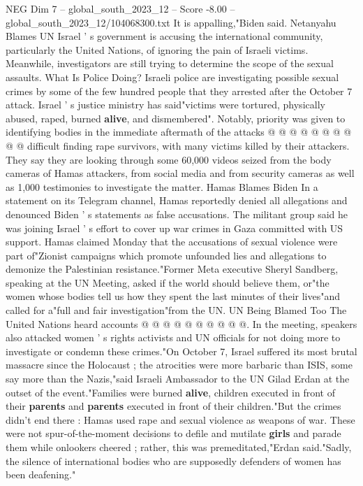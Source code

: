 \begin{textsample}{NEG Dim 7 – global\_south\_2023\_12 – Score -8.00 – global\_south\_2023\_12/104068300.txt}
It is appalling,"Biden said.
Netanyahu Blames UN Israel ' s government is accusing the international community, particularly the United Nations, of ignoring the pain of Israeli victims.
Meanwhile, investigators are still trying to determine the scope of the sexual assaults.
What Is Police Doing?
Israeli police are investigating possible sexual crimes by some of the few hundred people that they arrested after the October 7 attack.
Israel ' s justice ministry has said"victims were tortured, physically abused, raped, burned \textbf{alive}, and dismembered".
Notably, priority was given to identifying bodies in the immediate aftermath of the attacks @ @ @ @ @ @ @ @ @ @ difficult finding rape survivors, with many victims killed by their attackers.
They say they are looking through some 60,000 videos seized from the body cameras of Hamas attackers, from social media and from security cameras as well as 1,000 testimonies to investigate the matter.
Hamas Blames Biden In a statement on its Telegram channel, Hamas reportedly denied all allegations and denounced Biden ' s statements as false accusations.
The militant group said he was joining Israel ' s effort to cover up war crimes in Gaza committed with US support.
Hamas claimed Monday that the accusations of sexual violence were part of"Zionist campaigns which promote unfounded lies and allegations to demonize the Palestinian resistance."Former Meta executive Sheryl Sandberg, speaking at the UN Meeting, asked if the world should believe them, or"the women whose bodies tell us how they spent the last minutes of their lives"and called for a"full and fair investigation"from the UN.
UN Being Blamed Too The United Nations heard accounts @ @ @ @ @ @ @ @ @ @.
In the meeting, speakers also attacked women ' s rights activists and UN officials for not doing more to investigate or condemn these crimes."On October 7, Israel suffered its most brutal massacre since the Holocaust ; the atrocities were more barbaric than ISIS, some say more than the Nazis,"said Israeli Ambassador to the UN Gilad Erdan at the outset of the event."Families were burned \textbf{alive}, children executed in front of their \textbf{parents} and \textbf{parents} executed in front of their children."But the crimes didn't end there : Hamas used rape and sexual violence as weapons of war.
These were not spur-of-the-moment decisions to defile and mutilate \textbf{girls} and parade them while onlookers cheered ; rather, this was premeditated,"Erdan said."Sadly, the silence of international bodies who are supposedly defenders of women has been deafening."

\end{textsample}
